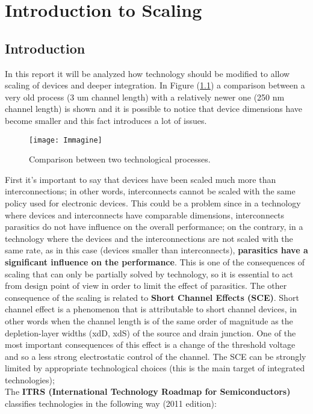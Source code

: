\documentclass[a4paper, 12pt, twoside, openright]{report}
\begin{document}
\tableofcontents


\chapter{Introduction to Scaling}


\section{Introduction}

In this report it will be analyzed how technology should be modified to allow scaling of devices and deeper integration. In Figure (\ref{confronto}) a comparison between a very old process (3 um channel length) with a relatively newer one (250 nm channel length) is shown and it is possible to notice that device dimensions have become smaller and this fact introduces a lot of issues.

	\begin{figure}[h]
	\centering
	\texttt{[image: Immagine]}
	\caption{Comparison between two technological processes.}
	\label{confronto}
	\end{figure}

First it's important to say that devices have been scaled much more than interconnections; in other words, interconnects cannot be scaled with the same policy used for electronic devices. This could be a problem since in a technology where devices and interconnects have comparable dimensions, interconnects parasitics do not have influence on the overall performance; on the contrary, in a technology where the devices and the interconnections are not scaled with the same rate, as in this case (devices smaller than interconnects), \textbf{parasitics have a significant influence on the performance}. This is one of the consequences of scaling that can only be partially solved by technology, so it is essential to act from design point of view in order to limit the effect of parasitics. The other consequence of the scaling is related to \textbf{Short Channel Effects (SCE)}. Short channel effect is a phenomenon that is attributable to short channel devices, in other words when the channel length is of the same order of magnitude as the depletion-layer widths (xdD, xdS) of the source and drain junction. One of the most important consequences of this effect is a change of the threshold voltage and so a less strong electrostatic control of the channel. The SCE can be strongly limited by appropriate technological choices (this is the main target of integrated technologies); \\
The \textbf{ITRS (International Technology Roadmap for Semiconductors)} classifies technologies in the following way (2011 edition):
\end{document}
